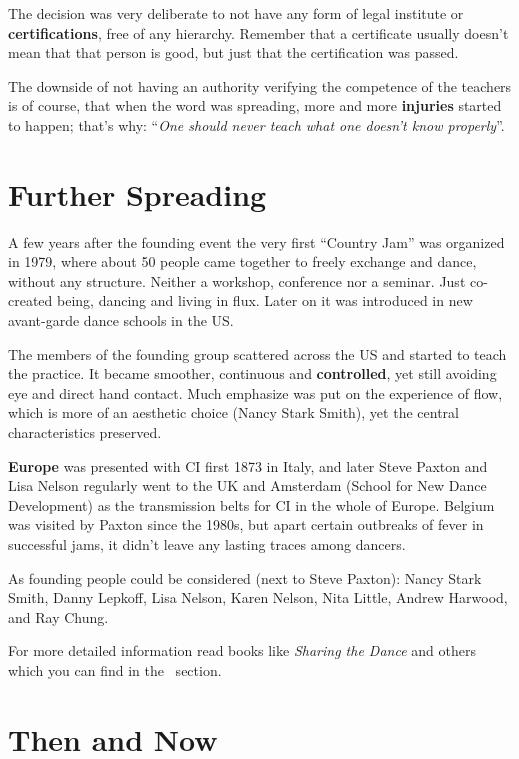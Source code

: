 The decision was very deliberate to not have any form of legal institute or \textbf{certifications}, free of any hierarchy.
Remember that a certificate usually doesn't mean that that person is good, but just that the certification was passed.

The downside of not having an authority verifying the competence of the teachers is of course, that when the word was spreading, more and more \textbf{injuries} started to happen; that's why: ``\textit{One should never teach what one doesn't know properly}''.

\section{Further Spreading}\label{sec:further-spreading}

A few years after the founding event the very first ``Country Jam'' was organized in 1979, where about 50 people came together to freely exchange and dance, without any structure.
Neither a workshop, conference nor a seminar.
Just co-created being, dancing and living in flux.
Later on it was introduced in new avant-garde dance schools in the US\@.

The members of the founding group scattered across the US and started to teach the practice.
It became smoother, continuous and \textbf{controlled}, yet still avoiding eye and direct hand contact.
Much emphasize was put on the experience of flow, which is more of an aesthetic choice (Nancy Stark Smith), yet the central characteristics preserved.

\textbf{Europe} was presented with CI first 1873 in Italy, and later Steve Paxton and Lisa Nelson regularly went to the UK and Amsterdam (School for New Dance Development) as the transmission belts for CI in the whole of Europe.
Belgium was visited by Paxton since the 1980s, but apart certain outbreaks of fever in successful jams, it didn't leave any lasting traces among dancers.

As founding people could be considered (next to Steve Paxton): Nancy Stark Smith, Danny Lepkoff, Lisa Nelson, Karen Nelson, Nita Little, Andrew Harwood, and Ray Chung.

For more detailed information read books like \textit{Sharing the Dance} and others which you can find in the~ section.

\section{Then and Now}\label{sec:then-and-now}

